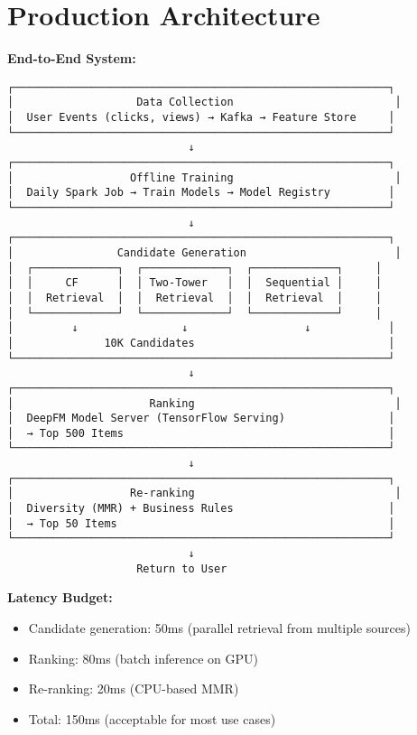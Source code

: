 \documentclass[10pt]{article}
\begin{document}
\section{Production Architecture}

\textbf{End-to-End System:}
\begin{verbatim}
┌──────────────────────────────────────────────────────────┐
│                   Data Collection                         │
│  User Events (clicks, views) → Kafka → Feature Store     │
└──────────────────────────────────────────────────────────┘
                            ↓
┌──────────────────────────────────────────────────────────┐
│                  Offline Training                         │
│  Daily Spark Job → Train Models → Model Registry         │
└──────────────────────────────────────────────────────────┘
                            ↓
┌──────────────────────────────────────────────────────────┐
│                Candidate Generation                       │
│  ┌─────────────┐  ┌─────────────┐  ┌─────────────┐     │
│  │     CF      │  │ Two-Tower   │  │  Sequential │     │
│  │  Retrieval  │  │  Retrieval  │  │  Retrieval  │     │
│  └─────────────┘  └─────────────┘  └─────────────┘     │
│         ↓                ↓                  ↓            │
│              10K Candidates                              │
└──────────────────────────────────────────────────────────┘
                            ↓
┌──────────────────────────────────────────────────────────┐
│                     Ranking                               │
│  DeepFM Model Server (TensorFlow Serving)                │
│  → Top 500 Items                                         │
└──────────────────────────────────────────────────────────┘
                            ↓
┌──────────────────────────────────────────────────────────┐
│                  Re-ranking                               │
│  Diversity (MMR) + Business Rules                        │
│  → Top 50 Items                                          │
└──────────────────────────────────────────────────────────┘
                            ↓
                    Return to User
\end{verbatim}

\textbf{Latency Budget:}
\begin{itemize}
\item Candidate generation: 50ms (parallel retrieval from multiple sources)
\item Ranking: 80ms (batch inference on GPU)
\item Re-ranking: 20ms (CPU-based MMR)
\item Total: 150ms (acceptable for most use cases)
\end{itemize}
\end{document}
